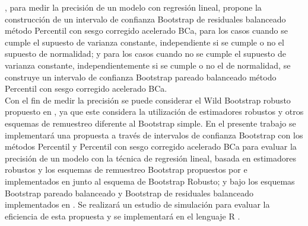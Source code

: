 \textcite{balam-2012}, para medir la precisión de un modelo con regresión lineal, propone la construcción de un intervalo de confianza Bootstrap de residuales balanceado método Percentil con sesgo corregido acelerado BCa, para los casos cuando se cumple el supuesto de varianza constante, independiente si se cumple o no el supuesto de normalidad; y para los casos cuando no se cumple el supuesto de varianza constante, independientemente si se cumple o no el de normalidad, se construye un intervalo de confianza Bootstrap pareado balanceado método Percentil con sesgo corregido acelerado BCa.\\

Con el fin de medir la precisión se puede considerar el Wild Bootstrap robusto propuesto en \textcite{rana-2012}, ya que este considera la utilización de estimadores robustos y otros esquemas de remuestreo diferente al Bootstrap simple.
En el presente trabajo se implementará una propuesta a través de intervalos de confianza Bootstrap con los métodos Percentil y Percentil con sesgo corregido acelerado BCa para evaluar la precisión de un modelo con la técnica de regresión lineal, basada en estimadores robustos y los esquemas de remuestreo Bootstrap propuestos por \textcite{rana-2012} e implementados en \textcite{zacarias-2023} junto al esquema de Bootstrap Robusto; y bajo los esquemas Bootstrap pareado balanceado y Bootstrap de residuales balanceado implementados en \textcite{balam-2012}. Se realizará un estudio de simulación para evaluar la eficiencia de esta propuesta y se implementará en el lenguaje R \parencite{R-2024}.\\
